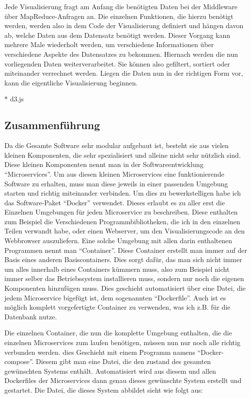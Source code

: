 \documentclass[12pt,ngerman,a4paperpaper,]{paper}
\begin{document}
Jede Visualisierung fragt am Anfang die benötigten Daten bei der
Middleware über MapReduce-Anfragen an. Die einzelnen Funktionen, die
hierzu benötigt werden, werden also in dem Code der Visualisierung
definiert und hängen davon ab, welche Daten aus dem Datensatz benötigt
werden. Dieser Vorgang kann mehrere Male wiederholt werden, um
verschiedene Informationen über verschiedene Aspekte des Datensatzes zu
bekommen. Hiernach werden die nun vorliegenden Daten weiterverarbeitet.
Sie können also gefiltert, sortiert oder miteinander verrechnet werden.
Liegen die Daten nun in der richtigen Form vor, kann die eigentliche
Visualisierung beginnen.

 * d3.js

\subsection{Zusammenführung}\label{zusammenfuxfchrung}

 Da die Gesamte Software sehr modular aufgebaut ist, besteht
sie aus vielen kleinen Komponenten, die sehr spezialisiert und alleine
nicht sehr nützlich sind. Diese kleinen Komponenten nennt man in der
Softwareentwicklung ``Microservices''. Um aus diesen kleinen
Microservices eine funktionierende Software zu erhalten, muss man diese
jeweils in einer passenden Umgebung starten und richtig miteinander
verbinden. Um dies zu bewerkstelligen habe ich das Software-Paket
``Docker'' verwendet. Dieses erlaubt es zu aller erst die Einzelnen
Umgebungen für jeden Microservice zu beschreiben. Diese enthalten zum
Beispiel die Verschiedenen Programmbibliotheken, die ich in den
einzelnen Teilen verwandt habe, oder einen Webserver, um den
Visualisierungscode an den Webbrowser auszuliefern. Eine solche Umgebung
mit allen darin enthaltenen Programmen nennt man ``Container''. Diese
Container erstellt man immer auf der Basis eines anderen
Basiscontainers. Dies sorgt dafür, das man sich nicht immer um alles
innerhalb eines Containers kümmern muss, also zum Beispiel nicht immer
selber das Betriebssystem installieren muss, sondern nur noch die
eigenen Komponenten hinzufügen muss. Dies geschieht automatisiert über
eine Datei, die jedem Microservice bigefügt ist, dem sogenannten
``Dockerfile''. Auch ist es möglich komplett vorgefertigte Container zu
verwenden, was ich z.B. für die Datenbank nutze.

Die einzelnen Container, die nun die komplette Umgebung enthalten, die
die einzelnen Microservices zum laufen benötigen, müssen nun nur noch
alle richtig verbunden werden. dies Geschieht mit einem Programm namens
``Docker-compose''. Diesem gibt man eine Datei, die den zustand des
gesamten gewünschten Systems enthält. Automatisiert wird aus diesem und
allen Dockerfiles der Microservices dann genau dieses gewünschte System
erstellt und gestartet. Die Datei, die dieses System abbildet sieht wie
folgt aus:
\end{document}
